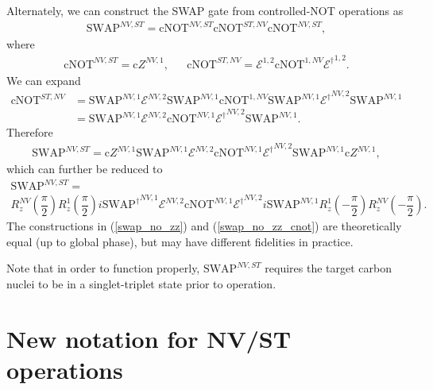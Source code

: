 \documentclass[11pt]{article}
\renewcommand{\t}{\text} %
\newcommand{\f}[2]{\dfrac{#1}{#2}} %
\newcommand{\p}[1]{\left(#1\right)} %
\newcommand{\E}{\mathcal E}
\begin{document}
Alternately, we can construct the SWAP gate from controlled-NOT
operations as
\begin{align}
  \t{SWAP}^{NV,ST}=\t{cNOT}^{NV,ST}\t{cNOT}^{ST,NV}\t{cNOT}^{NV,ST},
\end{align}
where
\begin{align}
  \t{cNOT}^{NV,ST}=\t{c}Z^{NV,1}, &&
  \t{cNOT}^{ST,NV}=\E^{1,2}\t{cNOT}^{1,NV}{\E^\dag}^{1,2}.
\end{align}
We can expand
\begin{align}
  \t{cNOT}^{ST,NV}&=\t{SWAP}^{NV,1}\E^{NV,2}\t{SWAP}^{NV,1}\t{cNOT}^{1,NV}
  \t{SWAP}^{NV,1}{\E^\dag}^{NV,2}\t{SWAP}^{NV,1} \\
  &=\t{SWAP}^{NV,1}\E^{NV,2}\t{cNOT}^{NV,1}{\E^\dag}^{NV,2}\t{SWAP}^{NV,1}.
\end{align}
Therefore
\begin{align}
  \t{SWAP}^{NV,ST}=\t{c}Z^{NV,1}\t{SWAP}^{NV,1}
  \E^{NV,2}\t{cNOT}^{NV,1}{\E^\dag}^{NV,2}
  \t{SWAP}^{NV,1}\t{c}Z^{NV,1},
\end{align}
which can further be reduced to
\begin{multline}
  \t{SWAP}^{NV,ST}= \\
  R_z^{NV}\p{\f\pi2}R_z^1\p{\f\pi2}{i\t{SWAP}^\dag}^{NV,1}
  \E^{NV,2}\t{cNOT}^{NV,1}{\E^\dag}^{NV,2}
  i\t{SWAP}^{NV,1}R_z^1\p{-\f\pi2}R_z^{NV}\p{-\f\pi2}.
  \label{swap_no_zz_cnot}
\end{multline}
The constructions in (\ref{swap_no_zz}) and (\ref{swap_no_zz_cnot})
are theoretically equal (up to global phase), but may have different
fidelities in practice.

Note that in order to function properly, $\t{SWAP}^{NV,ST}$ requires
the target carbon nuclei to be in a singlet-triplet state prior to
operation.

\newpage
\section*{New notation for NV/ST operations}
\end{document}
